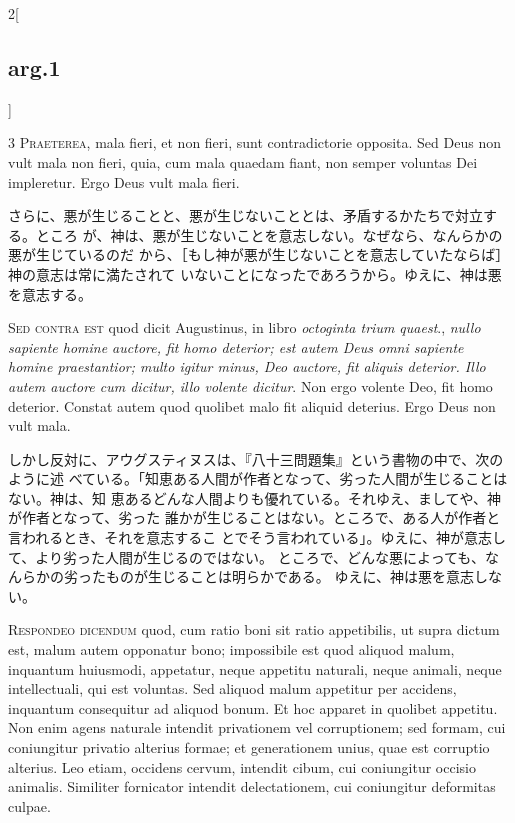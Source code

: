 \documentclass[paper=a4paper,fontsize=10pt,jafontsize=9pt,titlepage]{jlreq}
\begin{document}
\begin{paracol}{2}[\subsection{arg.1}]


{\scshape 3 Praeterea}, mala fieri, et non fieri, sunt
contradictorie opposita. Sed Deus non vult mala non fieri, quia, cum
mala quaedam fiant, non semper voluntas Dei impleretur. Ergo Deus vult
mala fieri.

\switchcolumn

さらに、悪が生じることと、悪が生じないこととは、矛盾するかたちで対立する。ところ
 が、神は、悪が生じないことを意志しない。なぜなら、なんらかの悪が生じているのだ
 から、［もし神が悪が生じないことを意志していたならば］神の意志は常に満たされて
 いないことになったであろうから。ゆえに、神は悪を意志する。

\switchcolumn*[\subsection{s.c.}]


{\scshape Sed contra est} quod dicit Augustinus, in libro {\itshape octoginta
trium quaest}., {\itshape nullo sapiente homine auctore, fit homo deterior; est
autem Deus omni sapiente homine praestantior; multo igitur minus, Deo auctore,
fit aliquis deterior. Illo autem auctore cum dicitur, illo volente dicitur}. Non
ergo volente Deo, fit homo deterior. Constat autem quod quolibet malo fit
aliquid deterius. Ergo Deus non vult mala.

\switchcolumn

しかし反対に、アウグスティヌスは、『八十三問題集』という書物の中で、次のように述
 べている。「知恵ある人間が作者となって、劣った人間が生じることはない。神は、知
 恵あるどんな人間よりも優れている。それゆえ、ましてや、神が作者となって、劣った
 誰かが生じることはない。ところで、ある人が作者と言われるとき、それを意志するこ
 とでそう言われている」。ゆえに、神が意志して、より劣った人間が生じるのではない。
 ところで、どんな悪によっても、なんらかの劣ったものが生じることは明らかである。
 ゆえに、神は悪を意志しない。



{\scshape Respondeo dicendum} quod, cum ratio boni sit ratio appetibilis, ut
supra dictum est, malum autem opponatur bono; impossibile est quod aliquod
malum, inquantum huiusmodi, appetatur, neque appetitu naturali, neque animali,
neque intellectuali, qui est voluntas. Sed aliquod malum appetitur per accidens,
inquantum consequitur ad aliquod bonum. Et hoc apparet in quolibet appetitu. Non
enim agens naturale intendit privationem vel corruptionem; sed formam, cui
coniungitur privatio alterius formae; et generationem unius, quae est corruptio
alterius. Leo etiam, occidens cervum, intendit cibum, cui coniungitur occisio
animalis. Similiter fornicator intendit delectationem, cui coniungitur
deformitas culpae.


\end{paracol}
\end{document}
